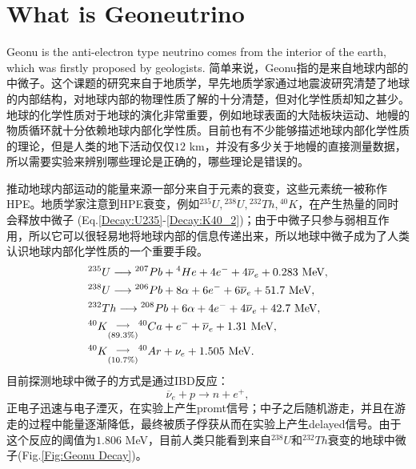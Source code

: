 		\section{What is Geoneutrino}
			Geonu is the anti-electron type neutrino comes from the interior of the earth, which was firstly proposed by geologists. 
			简单来说，Geonu指的是来自地球内部的中微子。这个课题的研究来自于地质学，早先地质学家通过地震波研究清楚了地球的内部结构，对地球内部的物理性质了解的十分清楚，但对化学性质却知之甚少。地球的化学性质对于地球的演化非常重要，例如地球表面的大陆板块运动、地幔的物质循环就十分依赖地球内部化学性质。目前也有不少能够描述地球内部化学性质的理论，但是人类的地下活动仅仅$12$ km，并没有多少关于地幔的直接测量数据，所以需要实验来辨别哪些理论是正确的，哪些理论是错误的。\par
			推动地球内部运动的能量来源一部分来自于元素的衰变，这些元素统一被称作HPE。地质学家注意到HPE衰变，例如${}^{235}U, {}^{238}U, {}^{232}Th, {}^{40}K$，在产生热量的同时会释放中微子\cite{fiorentini2007geo} (Eq.\ref{Decay:U235}-\ref{Decay:K40_2})；由于中微子只参与弱相互作用，所以它可以很轻易地将地球内部的信息传递出来，所以地球中微子成为了人类认识地球内部化学性质的一个重要手段。
				\begin{align}
					&{}^{235}U \longrightarrow {}^{207}Pb + {}^{4}He + 4e^- + 4\overline{\nu}_e + 0.283 \text{ MeV},
					\label{Decay:U235}\\
					&{}^{238}U \longrightarrow {}^{206}Pb + 8\alpha + 6e^- + 6\overline{\nu}_e + 51.7 \text{ MeV},
					\label{Decay:U238}\\
					&{}^{232}Th \longrightarrow {}^{208}Pb + 6\alpha + 4e^- + 4\overline{\nu}_e + 42.7 \text{ MeV},
					\label{Decay:Th232}\\
					&{}^{40}K \overunderset{\longrightarrow}{(89.3\%)} {}^{40}Ca + e^- + \overline{\nu}_e + 1.31 \text{ MeV},
					\label{Decay:K40_1}\\
					&{}^{40}K \overunderset{\longrightarrow}{(10.7\%)} {}^{40}Ar + \nu_e + 1.505 \text{ MeV}.
					\label{Decay:K40_2}
				\end{align}
			目前探测地球中微子的方式是通过IBD反应：
				\begin{equation}
					\overline{\nu}_e + p \longrightarrow n + e^+,
				\end{equation}
			正电子迅速与电子湮灭，在实验上产生promt信号；中子之后随机游走，并且在游走的过程中能量逐渐降低，最终被质子俘获从而在实验上产生delayed信号。由于这个反应的阈值为$1.806$ MeV，目前人类只能看到来自${}^{238}U$和${}^{232}Th$衰变的地球中微子(Fig.\ref{Fig:Geonu Decay})。

